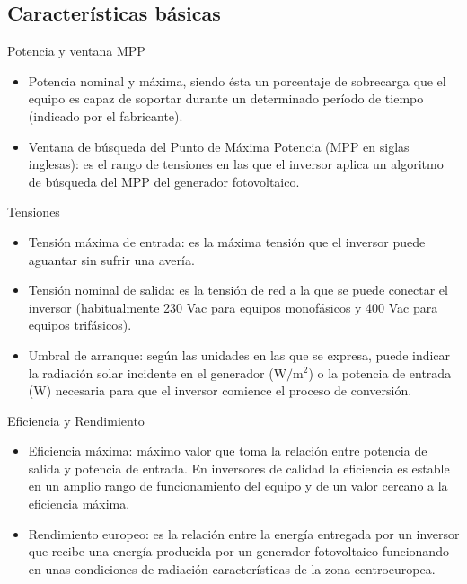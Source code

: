 \documentclass[xcolor={usenames,svgnames,dvipsnames}]{beamer}
\begin{document}
\subsection{Características básicas}
\label{sec:org462dc13}
\begin{frame}[label={sec:org5184541}]{Potencia y ventana MPP}
\begin{itemize}
\item \alert{Potencia nominal y máxima}, siendo ésta un porcentaje de sobrecarga
que el equipo es capaz de soportar durante un determinado período de
tiempo (indicado por el fabricante).

\item \alert{Ventana de búsqueda del Punto de Máxima Potencia} (MPP en siglas
inglesas): es el rango de tensiones en las que el inversor aplica un
algoritmo de búsqueda del MPP del generador fotovoltaico.
\end{itemize}
\end{frame}

\begin{frame}[label={sec:org3d22c33}]{Tensiones}
\begin{itemize}
\item \alert{Tensión máxima de entrada}: es la máxima tensión que el inversor
puede aguantar sin sufrir una avería.

\item \alert{Tensión nominal de salida}: es la tensión de red a la que se puede
conectar el inversor (habitualmente 230 Vac para equipos monofásicos
y 400 Vac para equipos trifásicos).

\item \alert{Umbral de arranque}: según las unidades en las que se expresa, puede
indicar la radiación solar incidente en el generador
(\(\si{\watt\per\meter\squared}\)) o la potencia de entrada (W)
necesaria para que el inversor comience el proceso de conversión.
\end{itemize}
\end{frame}

\begin{frame}[label={sec:org55d8fda}]{Eficiencia y Rendimiento}
\begin{itemize}
\item \alert{Eficiencia máxima}: máximo valor que toma la relación entre potencia
de salida y potencia de entrada. En inversores de calidad la
eficiencia es estable en un amplio rango de funcionamiento del equipo
y de un valor cercano a la eficiencia máxima.

\item \alert{Rendimiento europeo}: es la relación entre la energía entregada por
un inversor que recibe una energía producida por un generador
fotovoltaico funcionando en unas condiciones de radiación
características de la zona centroeuropea.
\end{itemize}
\end{frame}
\end{document}
